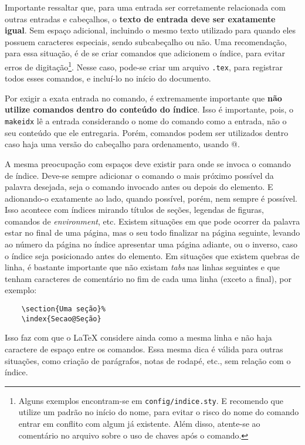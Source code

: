     Importante ressaltar que, para uma entrada ser corretamente relacionada com outras entradas e cabeçalhos, o \textbf{texto de entrada deve ser exatamente igual}. Sem espaço adicional, incluindo o mesmo texto utilizado para quando eles possuem caracteres especiais, sendo subcabeçalho\myIdxSubcabecalho{} ou não. Uma recomendação, para essa situação, é de se criar comandos que adicionem o índice, para evitar erros de digitação\footnote{Alguns exemplos encontram-se em \texttt{config/indice.sty}. E recomendo que utilize um padrão no início do nome, para evitar o risco do nome do comando entrar em conflito com algum já existente. Além disso, atente-se ao comentário no arquivo sobre o uso de chaves após o comando.}. Nesse caso, pode-se criar um arquivo \texttt{.tex}, para registrar todos esses comandos, e incluí-lo no início do documento. 
    
    Por exigir a exata entrada no comando, é extremamente importante que \textbf{não utilize comandos dentro do conteúdo do índice}. Isso é importante, pois, o \texttt{makeidx} lê a entrada considerando o nome do comando como a entrada, não o seu conteúdo que ele entregaria. Porém, comandos podem ser utilizados dentro caso haja uma versão do cabeçalho para ordenamento, usando @. 

    A mesma preocupação com espaços deve existir para onde se invoca o comando de índice. Deve-se sempre adicionar o comando o mais próximo possível da palavra desejada, seja o comando invocado antes ou depois do elemento. E adionando-o exatamente ao lado, quando possível, porém, nem sempre é possível. Isso acontece com índices mirando títulos de seções, legendas de figuras, comandos de \textit{environment}, etc. Existem situações em que pode ocorrer da palavra estar no final de uma página, mas o seu todo finalizar na página seguinte, levando ao número da página no índice apresentar uma página adiante, ou o inverso, caso o índice seja posicionado antes do elemento. Em situações que existem quebras de linha, é bastante importante que não existam \textit{tabs} nas linhas seguintes e que tenham caracteres de comentário no fim de cada uma linha (exceto a final), por exemplo:
\begin{verbatim}
    \section{Uma seção}%
    \index{Secao@Seção}
\end{verbatim}%
Isso faz com que o \LaTeX{} considere ainda como a mesma linha e não haja caractere de espaço entre os comandos. Essa mesma dica é válida para outras situações, como criação de parágrafos, notas de rodapé, etc., sem relação com o índice.

